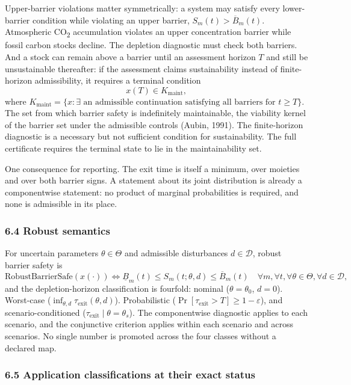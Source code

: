 \documentclass[11pt]{article}
\begin{document}
Upper-barrier violations matter symmetrically: a system may satisfy every lower-barrier condition while violating an upper barrier, \(S_m(t) > \overline{B}_m(t)\). Atmospheric CO\textsubscript{2} accumulation violates an upper concentration barrier while fossil carbon stocks decline. The depletion diagnostic must check both barriers. And a stock can remain above a barrier until an assessment horizon \(T\) and still be unsustainable thereafter: if the assessment claims sustainability instead of finite-horizon admissibility, it requires a terminal condition \[x(T) \in K_{\mathrm{maint}},\] where \(K_{\mathrm{maint}} = \{ x : \exists \text{ an admissible continuation satisfying all barriers for } t \ge T \}\). The set from which barrier safety is indefinitely maintainable, the viability kernel of the barrier set under the admissible controls (Aubin, 1991). The finite-horizon diagnostic is a necessary but not sufficient condition for sustainability. The full certificate requires the terminal state to lie in the maintainability set.

One consequence for reporting. The exit time is itself a minimum, over moieties and over both barrier signs. A statement about its joint distribution is already a componentwise statement: no product of marginal probabilities is required, and none is admissible in its place.


\subsubsection{6.4 Robust semantics}\label{robust-semantics}

For uncertain parameters \(\theta \in \Theta\) and admissible disturbances \(d \in \mathcal{D}\), robust barrier safety is \[\mathrm{RobustBarrierSafe}(x(\cdot)) \iff \underline{B}_m(t) \le S_m(t; \theta, d) \le \overline{B}_m(t) \quad \forall m, \forall t, \forall \theta \in \Theta, \forall d \in \mathcal{D},\] and the depletion-horizon classification is fourfold: nominal (\(\theta = \theta_0\), \(d = 0\)). Worst-case (\(\inf_{\theta,d} \tau_{\mathrm{exit}}(\theta,d)\)). Probabilistic (\(\Pr[\tau_{\mathrm{exit}} > T] \ge 1 - \varepsilon\)), and scenario-conditioned (\(\tau_{\mathrm{exit}} \mid \theta = \theta_s\)). The componentwise diagnostic applies to each scenario, and the conjunctive criterion applies within each scenario and across scenarios. No single number is promoted across the four classes without a declared map.

\subsubsection{6.5 Application classifications at their exact
status}\label{application-classifications-at-their-exact-status}
\end{document}
